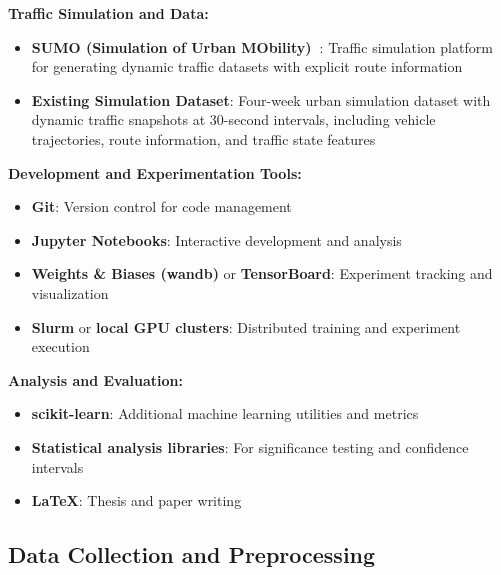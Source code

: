 \textbf{Traffic Simulation and Data:}
\begin{itemize}
    \item \textbf{SUMO (Simulation of Urban MObility)~\cite{SUMO2018}}: Traffic simulation platform for generating dynamic traffic datasets with explicit route information
    \item \textbf{Existing Simulation Dataset}: Four-week urban simulation dataset with dynamic traffic snapshots at 30-second intervals, including vehicle trajectories, route information, and traffic state features
\end{itemize}

\textbf{Development and Experimentation Tools:}
\begin{itemize}
    \item \textbf{Git}: Version control for code management
    \item \textbf{Jupyter Notebooks}: Interactive development and analysis
    \item \textbf{Weights \& Biases (wandb)} or \textbf{TensorBoard}: Experiment tracking and visualization
    \item \textbf{Slurm} or \textbf{local GPU clusters}: Distributed training and experiment execution
\end{itemize}

\textbf{Analysis and Evaluation:}
\begin{itemize}
    \item \textbf{scikit-learn}: Additional machine learning utilities and metrics
    \item \textbf{Statistical analysis libraries}: For significance testing and confidence intervals
    \item \textbf{LaTeX}: Thesis and paper writing
\end{itemize}

\subsection{Data Collection and Preprocessing}


